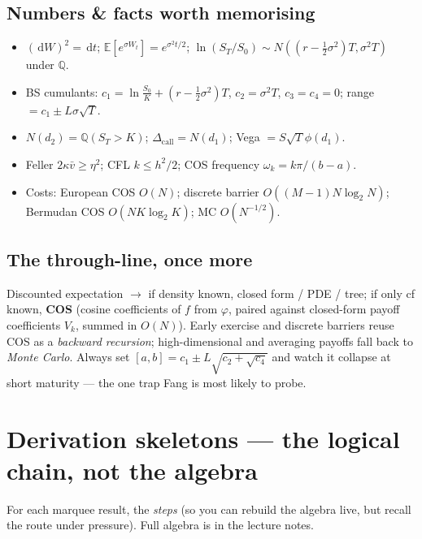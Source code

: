 \documentclass[11pt]{article}
\newcommand{\E}{\mathbb{E}}
\newcommand{\Q}{\mathbb{Q}}
\newcommand{\dd}{\,\mathrm{d}}
\newcommand{\ch}{\varphi}
\newcommand{\om}{\omega_k}
\begin{document}
\subsection*{Numbers \& facts worth memorising}
\begin{itemize}
  \item $(\dd W)^2=\dd t$; $\E[e^{\sigma W_t}]=e^{\sigma^2t/2}$; $\ln(S_T/S_0)\sim N((r-\tfrac12\sigma^2)T,
  \sigma^2T)$ under $\Q$.
  \item BS cumulants: $c_1=\ln\tfrac{S_0}{K}+(r-\tfrac12\sigma^2)T$, $c_2=\sigma^2T$, $c_3=c_4=0$;
  range $=c_1\pm L\sigma\sqrt T$.
  \item $N(d_2)=\Q(S_T>K)$; $\Delta_{\text{call}}=N(d_1)$; Vega $=S\sqrt T\phi(d_1)$.
  \item Feller $2\kappa\bar v\ge\eta^2$; CFL $k\le h^2/2$; COS frequency $\om=k\pi/(b-a)$.
  \item Costs: European COS $O(N)$; discrete barrier $O((M-1)N\log_2N)$; Bermudan COS $O(NK\log_2K)$;
  MC $O(N^{-1/2})$.
\end{itemize}

\subsection*{The through-line, once more}
Discounted expectation $\to$ if density known, closed form / PDE / tree; if only cf known, \textbf{COS} (cosine
coefficients of $f$ from $\ch$, paired against closed-form payoff coefficients $V_k$, summed in $O(N)$).
Early exercise and discrete barriers reuse COS as a \emph{backward recursion}; high-dimensional and averaging
payoffs fall back to \emph{Monte Carlo}. Always set $[a,b]=c_1\pm L\sqrt{c_2+\sqrt{c_4}}$ and watch it collapse
at short maturity --- the one trap Fang is most likely to probe.

\section{Derivation skeletons --- the logical chain, not the algebra}
\noindent For each marquee result, the \emph{steps} (so you can rebuild the algebra live, but recall the route
under pressure). Full algebra is in the lecture notes.
\end{document}
